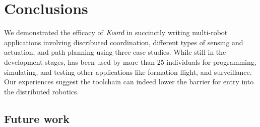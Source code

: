 \section{Conclusions}
\label{sec:conclusion}


We demonstrated the efficacy of $\emph{Koord}$ in succinctly writing multi-robot applications involving discributed coordination, different types of sensing and actuation, and path planning using three case studies. While still in the development stages, \CyPhyHouse has been used by more than 25 individuals for programming, simulating, and testing other applications like formation flight, and surveillance. Our experiences suggest the toolchain can indeed lower the barrier for entry into the distributed robotics.

\subsection{Future work}

